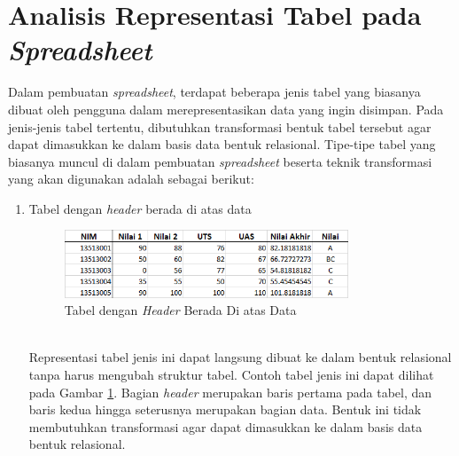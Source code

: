 \section{Analisis Representasi Tabel pada \textit{Spreadsheet}}
Dalam pembuatan \textit{spreadsheet}, terdapat beberapa jenis tabel yang biasanya dibuat oleh pengguna dalam merepresentasikan data yang ingin disimpan. Pada jenis-jenis tabel tertentu, dibutuhkan transformasi bentuk tabel tersebut agar dapat dimasukkan ke dalam basis data bentuk relasional. Tipe-tipe tabel yang biasanya muncul di dalam pembuatan \textit{spreadsheet} beserta teknik transformasi yang akan digunakan adalah sebagai berikut:
\begin{enumerate}
	\item Tabel dengan \textit{header} berada di atas data
	\begin{figure}[htbp]
	    \centering
	    \includegraphics[width=0.8\textwidth]{resources/chapter-3-tabletype-1.png}
	    \caption{Tabel dengan \textit{Header} Berada Di atas Data}
		\label{TabelTipe1}
	\end{figure}\\
	Representasi tabel jenis ini dapat langsung dibuat ke dalam bentuk relasional tanpa harus mengubah struktur tabel. Contoh tabel jenis ini dapat dilihat pada Gambar \ref{TabelTipe1}. Bagian \textit{header} merupakan baris pertama pada tabel, dan baris kedua hingga seterusnya merupakan bagian data. Bentuk ini tidak membutuhkan transformasi agar dapat dimasukkan ke dalam basis data bentuk relasional.


\end{enumerate}
